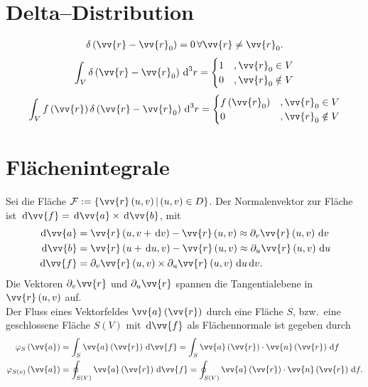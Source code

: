 \documentclass[a4paper,12pt]{article}
\newcommand{\td}{\,\text{d}}
\numberwithin{equation}{section}
\begin{document}
\section{Delta--Distribution}
\begin{align} 
        \delta \left(\vv{r}-\vv{r}_0\right)=0\,\forall \vv{r}\neq \vv{r}_0
.\end{align} 
\begin{align} 
        \int_{V}^{}\delta \left(\vv{r}-\vv{r}_0\right)\td ^3r=\begin{cases}
                1&,\vv{r}_0 \in V\\
                0&,\vv{r}_0 \notin V
        \end{cases}
\end{align} 
\begin{align} 
        \int_{V}^{}f\left(\vv{r}\right)\delta \left(\vv{r}-\vv{r}_0\right)\td ^3r=\begin{cases}
                f\left(\vv{r}_0\right)&,\vv{r}_0 \in V\\
                0&,\vv{r}_0 \notin V
        \end{cases}
\end{align} 


\newpage
\section{Flächenintegrale}
Sei die Fläche $\mathcal{F}:=\left\{\vv{r}\left(u,v\right)|\left(u,v\right) \in D\right\}$. Der Normalenvektor zur Fläche ist $\td \vv{f}=\td \vv{a}\times \td \vv{b}$, mit
\begin{align} 
        \td \vv{a}&=\vv{r}\left(u,v+\td v\right)-\vv{r}\left(u,v\right)\approx \partial_v \vv{r}\left(u,v\right)\td v\\
        \td \vv{b}&=\vv{r}\left(u+\td u,v\right)-\vv{r}\left(u,v\right)\approx \partial_u \vv{r}\left(u,v\right)\td u\\
        \td \vv{f}&=\partial_v \vv{r}\left(u,v\right)\times \partial_u\vv{r}\left(u,v\right)\td u\td v
.\end{align} 
Die Vektoren $\partial_v \vv{r}$ und $\partial_u \vv{r}$ spannen die Tangentialebene in $\vv{r}\left(u,v\right)$ auf.\\\indent
Der Fluss eines Vektorfeldes $\vv{a}\left(\vv{r}\right)$ durch eine Fläche $S$, bzw.\ eine geschlossene Fläche $S\left(V\right)$ mit $\td \vv{f}$ als Flächennormale ist gegeben durch
\begin{align} 
        \varphi _S\left(\vv{a}\right)&=\int_{S}^{}\vv{a}\left(\vv{r}\right)\td \vv{f}=\int_{S}^{}\vv{a}\left(\vv{r}\right)\cdot \vv{n}\left(\vv{r}\right)\td f\\
        \varphi _{S\left(v\right)}\left(\vv{a}\right)&=\oint_{S\left(V\right)}^{}\vv{a}\left(\vv{r}\right)\td \vv{f}=\oint_{S\left(V\right)}^{}\vv{a}\left(\vv{r}\right)\cdot \vv{n}\left(\vv{r}\right)\td f
.\end{align} 
\end{document}
